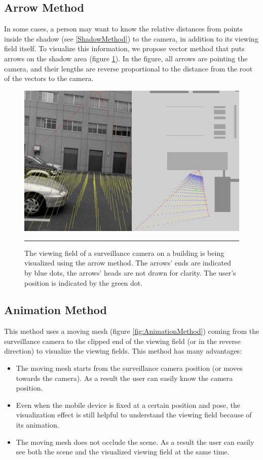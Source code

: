 \subsection{Arrow Method}

In some cases, a person may want to know the relative distances from points inside the shadow (see \ref{ShadowMethod}) to the camera, in addition to its viewing field itself. To visualize this information, we propose vector method that puts arrows on the shadow area (figure \ref{fig:ArrowMethod}). In the figure, all arrows are pointing the camera, and their lengths are reverse proportional to the distance from the root of the vectors to the camera.

\begin{figure}[htbp]
	\centering
	\includegraphics[width=14cm]{./Primitives/theory_arrow.png}
	\rule{35em}{0.5pt}
	\caption[Arrow method]{The viewing field of a surveillance camera on a building is being visualized using the arrow method. The arrows' ends are indicated by blue dots, the arrows' heads are not drawn for clarity. The user's position is indicated by the green dot.}
	\label{fig:ArrowMethod}
\end{figure}

\subsection{Animation Method}

This method uses a moving mesh (figure \ref{fig:AnimationMethod}) coming from the surveillance camera to the clipped end of the viewing field (or in the reverse direction) to visualize the viewing fields. This method has  many advantages:

\begin{itemize}
	\item The moving mesh starts from the surveillance camera position (or moves towards the camera). As a result the user can easily know the camera position.
	\item Even when the mobile device is fixed at a certain position and pose, the visualization effect is still helpful to understand the viewing field because of its animation.
	\item The moving mesh does not occlude the scene. As a result the user can easily see both the scene and the visualized viewing field at the same time.
\end{itemize}

